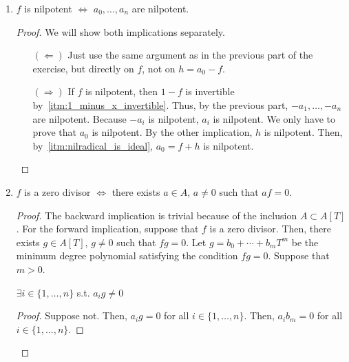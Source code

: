 \begin{problem}
\begin{enumerate}[label=(\theproblem.\arabic*),ref=\theproblem.\arabic*]
        \item \label{itm:nilponent_implies_nilponent_coefficients} $f$ is nilpotent $\iff$ $a_0, \ldots, a_n$ are nilpotent.
            \begin{sol}
                \begin{proof}
                    We will show both implications separately.
                    \begin{itemize}
                        \item[$(\Leftarrow)$]
                        Just use the same argument as in the previous part of the exercise, but directly on $f$, not on $h = a_0-f$.
                        \item[$(\Rightarrow)$]
                        If $f$ is nilpotent, then $1 - f$ is invertible by~\ref{itm:1_minus_x_invertible}.
                        Thus, by the previous part, $-a_1, \ldots, -a_n$ are nilpotent.
                        Because $-a_i$ is nilpotent, $a_i$ is nilpotent.
                        We only have to prove that $a_0$ is nilpotent.
                        By the other implication, $h$ is nilpotent.
                        Then, by~\ref{itm:nilradical_is_ideal}, $a_0 = f + h$ is nilpotent.
                    \end{itemize}
                \end{proof}
            \end{sol}
        \item $f$ is a zero divisor $\iff$ there exists $a \in A$, $a \neq 0$ such that $af = 0$.
            \begin{sol}
                \begin{proof}
                    The backward implication is trivial because of the inclusion $A \subset A[T]$.
                    For the forward implication, suppose that $f$ is a zero divisor.
                    Then, there exists $g \in A[T]$, $g \neq 0$ such that $fg = 0$.
                    Let $g = b_0 + \cdots + b_m T^m$ be the minimum degree polynomial satisfying the condition $fg = 0$.
                    Suppose that $m > 0$.
                    \begin{claim}
                        $\exists i \in \{1, \ldots, n\}$ s.t. $a_i g \neq 0$
                        \begin{proof}
                            Suppose not.
                            Then, $a_i g = 0$ for all $i \in \{1, \dots, n\}$.
                            Then, $a_i b_m = 0$ for all $i \in \{1, \dots, n\}$.

\end{proof}
\end{claim}
\end{proof}
\end{sol}
\end{enumerate}
\end{problem}
